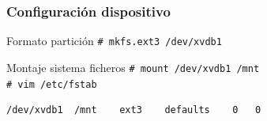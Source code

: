 \documentclass{beamer}
\begin{document}
\begin{frame}[fragile]
  \frametitle{Configuración dispositivo}
  \begin{block}{Formato partición}
    \texttt{\# mkfs.ext3 /dev/xvdb1}
  \end{block}
  \begin{block}{Montaje sistema ficheros}
    \texttt{\# mount /dev/xvdb1 /mnt} \\
    \texttt{\# vim /etc/fstab} \\
    \small{\begin{verbatim}
/dev/xvdb1	/mnt	ext3	defaults	0	0
    \end{verbatim}}
  \end{block}
\end{frame}
\end{document}
